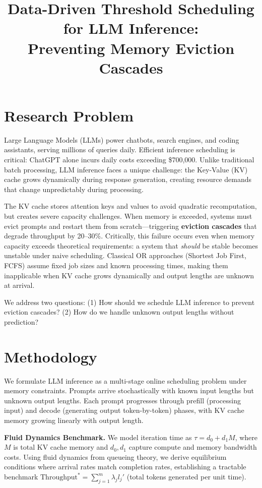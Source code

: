 \documentclass[11pt]{article}
\title{Data-Driven Threshold Scheduling for LLM Inference: \\ Preventing Memory Eviction Cascades}
\author{}
\date{}
\begin{document}
\maketitle
\thispagestyle{empty}

\vspace{-1.5em}

\section*{Research Problem}

Large Language Models (LLMs) power chatbots, search engines, and coding assistants, serving millions of queries daily. Efficient inference scheduling is critical: ChatGPT alone incurs daily costs exceeding \$700,000. Unlike traditional batch processing, LLM inference faces a unique challenge: the Key-Value (KV) cache grows dynamically during response generation, creating resource demands that change unpredictably during processing.

The KV cache stores attention keys and values to avoid quadratic recomputation, but creates severe capacity challenges. When memory is exceeded, systems must evict prompts and restart them from scratch---triggering \textbf{eviction cascades} that degrade throughput by 20--30\%. Critically, this failure occurs even when memory capacity exceeds theoretical requirements: a system that \emph{should} be stable becomes unstable under naive scheduling. Classical OR approaches (Shortest Job First, FCFS) assume fixed job sizes and known processing times, making them inapplicable when KV cache grows dynamically and output lengths are unknown at arrival.

We address two questions: (1) How should we schedule LLM inference to prevent eviction cascades? (2) How do we handle unknown output lengths without prediction?

\section*{Methodology}

We formulate LLM inference as a multi-stage online scheduling problem under memory constraints. Prompts arrive stochastically with known input lengths but unknown output lengths. Each prompt progresses through prefill (processing input) and decode (generating output token-by-token) phases, with KV cache memory growing linearly with output length.

\textbf{Fluid Dynamics Benchmark.} We model iteration time as $\tau = d_0 + d_1 M$, where $M$ is total KV cache memory and $d_0, d_1$ capture compute and memory bandwidth costs. Using fluid dynamics from queueing theory, we derive equilibrium conditions where arrival rates match completion rates, establishing a tractable benchmark $\text{Throughput}^* = \sum_{j=1}^m \lambda_j l_j'$ (total tokens generated per unit time).
\end{document}
